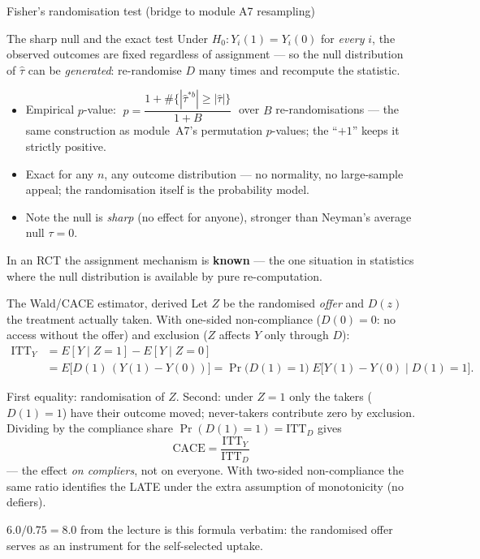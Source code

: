 \documentclass[aspectratio=169,11pt]{beamer}
\begin{document}
\begin{frame}{Fisher's randomisation test (bridge to module A7 resampling)}
  \footnotesize
  \begin{block}{The sharp null and the exact test}
    Under $H_0\!: Y_i(1) = Y_i(0)$ for \emph{every} $i$, the observed outcomes are fixed
    regardless of assignment --- so the null distribution of $\hat\tau$ can be
    \emph{generated}: re-randomise $D$ many times and recompute the statistic.
  \end{block}
  \begin{readme}
    \begin{itemize}
      \item Empirical $p$-value:
            $\;p = \dfrac{1 + \#\{|\hat\tau^{*b}| \ge |\hat\tau|\}}{1 + B}\;$ over $B$
            re-randomisations --- the same construction as module~A7's permutation
            $p$-values; the ``$+1$'' keeps it strictly positive.
      \item Exact for any $n$, any outcome distribution --- no normality, no large-sample
            appeal; the randomisation itself is the probability model.
      \item Note the null is \emph{sharp} (no effect for anyone), stronger than
            Neyman's average null $\tau = 0$.
    \end{itemize}
  \end{readme}
  \begin{takeaway}
    In an RCT the assignment mechanism is \textbf{known} --- the one situation in
    statistics where the null distribution is available by pure re-computation.
  \end{takeaway}
\end{frame}

\begin{frame}{The Wald/CACE estimator, derived}
  \scriptsize
  Let $Z$ be the randomised \emph{offer} and $D(z)$ the treatment actually taken. With
  one-sided non-compliance ($D(0)=0$: no access without the offer) and exclusion
  ($Z$ affects $Y$ only through $D$):
  \begin{align*}
    \mathrm{ITT}_Y &= E[Y\mid Z{=}1] - E[Y\mid Z{=}0] \\
      &= E\big[D(1)\,(Y(1)-Y(0))\big]
       = \Pr\big(D(1)=1\big)\; E\big[Y(1)-Y(0)\mid D(1)=1\big] .
  \end{align*}
  \begin{readme}
    First equality: randomisation of $Z$. Second: under $Z=1$ only the takers
    ($D(1)=1$) have their outcome moved; never-takers contribute zero by exclusion.
    Dividing by the compliance share $\Pr(D(1)=1) = \mathrm{ITT}_D$ gives
    \[
      \boxed{\;\mathrm{CACE} = \frac{\mathrm{ITT}_Y}{\mathrm{ITT}_D}\;}
    \]
    --- the effect \emph{on compliers}, not on everyone. With two-sided non-compliance
    the same ratio identifies the LATE under the extra assumption of monotonicity
    (no defiers).
  \end{readme}
  \begin{takeaway}
    $6.0 / 0.75 = 8.0$ from the lecture is this formula verbatim: the randomised offer
    serves as an instrument for the self-selected uptake.
  \end{takeaway}
\end{frame}
\end{document}
